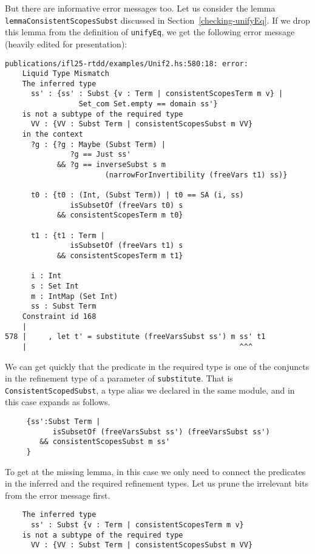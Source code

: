 \documentclass[sigconf]{acmart}
\newcommand{\tc}[1]{{\small\texttt{#1}}}
\begin{document}
But there are informative error messages too. Let us consider the lemma \tc{lemma\-Consistent\-Scopes\-Subst} discussed in
Section~\ref{checking-unifyEq}.
If we drop this lemma from the definition of \tc{unifyEq}, we get the following
error message (heavily edited for presentation):
\begin{verbatim}
publications/ifl25-rtdd/examples/Unif2.hs:580:18: error:
    Liquid Type Mismatch
    The inferred type
      ss' : {ss' : Subst {v : Term | consistentScopesTerm m v} |
                 Set_com Set.empty == domain ss'}
    is not a subtype of the required type
      VV : {VV : Subst Term | consistentScopesSubst m VV}
    in the context
      ?g : {?g : Maybe (Subst Term) |
               ?g == Just ss'
            && ?g == inverseSubst s m
                       (narrowForInvertibility (freeVars t1) ss)}

      t0 : {t0 : (Int, (Subst Term)) | t0 == SA (i, ss)
               isSubsetOf (freeVars t0) s
            && consistentScopesTerm m t0}

      t1 : {t1 : Term |
               isSubsetOf (freeVars t1) s
            && consistentScopesTerm m t1}

      i : Int
      s : Set Int
      m : IntMap (Set Int)
      ss : Subst Term
    Constraint id 168
    |
578 |     , let t' = substitute (freeVarsSubst ss') m ss' t1
    |                                                 ^^^
\end{verbatim}

We can get quickly that the predicate in the required type is one of the
conjuncts in the refinement type of
a parameter of \tc{substitute}. That is \tc{ConsistentScopedSubst}, a type alias
we declared in the same module, and in this case expands as follows.

\begin{verbatim}
     {ss':Subst Term |
           isSubsetOf (freeVarsSubst ss') (freeVarsSubst ss')
        && consistentScopesSubst m ss'
     }
\end{verbatim}

To get at the missing lemma, in this case we only need to connect the predicates
in the inferred and the required refinement types. Let us prune the irrelevant
bits from the error message first.

\begin{verbatim}
    The inferred type
      ss' : Subst {v : Term | consistentScopesTerm m v}
    is not a subtype of the required type
      VV : {VV : Subst Term | consistentScopesSubst m VV}
\end{verbatim}
\end{document}
